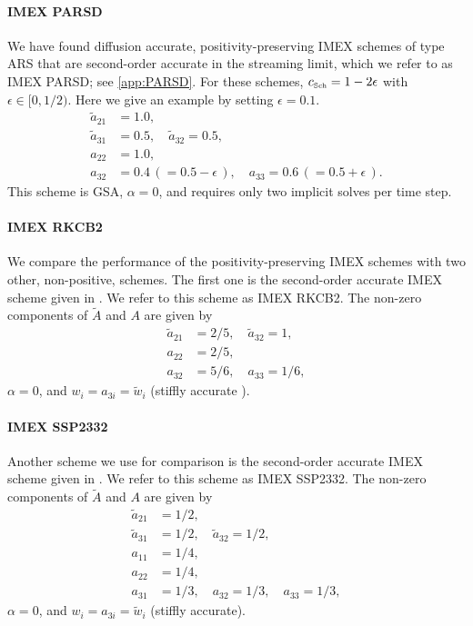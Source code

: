\paragraph{IMEX PARSD}

We have found diffusion accurate, positivity-preserving IMEX schemes of type ARS that are second-order accurate in the streaming limit, which we refer to as IMEX PARSD; see \ref{app:PARSD}.  
For these schemes, $c_{\mbox{\tiny Sch}}= 1 - 2\epsilon$ with $\epsilon \in [0, 1/2)$.
Here we give an example by setting $\epsilon=0.1$.
\begin{align*}
  \tilde{a}_{21} & = 1.0, \\
  \tilde{a}_{31} & = 0.5, \quad \tilde{a}_{32} = 0.5, \\
  a_{22} & = 1.0, \nonumber \\
  a_{32} & = 0.4 \,( = 0.5 - \epsilon\,), \quad a_{33} = 0.6 \,( = 0.5 + \epsilon\,). 
\end{align*}
This scheme is GSA, $\alpha=0$, and requires only two implicit solves per time step.  

\paragraph{IMEX RKCB2}

We compare the performance of the positivity-preserving IMEX schemes with two other, non-positive, schemes.  
The first one is the second-order accurate IMEX scheme given in \cite{cavaglieriBewley2015}.  
We refer to this scheme as IMEX RKCB2.  
The non-zero components of $\tilde{A}$ and $A$ are given by
\begin{align*}
  \tilde{a}_{21} &= 2/5, \quad \tilde{a}_{32} = 1, \\
  a_{22} &= 2/5, \nonumber \\
  a_{32} &= 5/6, \quad a_{33} = 1/6,
\end{align*}
$\alpha=0$, and $w_{i} = a_{3i} = \tilde{w}_{i}$ (stiffly accurate \cite{pareschiRusso_2005}).

\paragraph{IMEX SSP2332}

Another scheme we use for comparison is the second-order accurate IMEX scheme given in \cite{pareschiRusso_2005}.  
We refer to this scheme as IMEX SSP2332.  
The non-zero components of $\tilde{A}$ and $A$ are given by
\begin{align*}
  \tilde{a}_{21} &= 1/2, \\
  \tilde{a}_{31} &= 1/2, \quad \tilde{a}_{32} = 1/2, \\
  a_{11} &= 1/4, \\
  a_{22} &= 1/4, \\
  a_{31} &= 1/3, \quad a_{32} = 1/3, \quad a_{33} = 1/3, 
\end{align*}
$\alpha=0$, and $w_{i} = a_{3i} = \tilde{w}_{i}$ (stiffly accurate).

